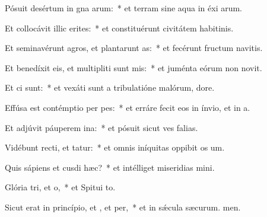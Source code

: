 \item Pósuit desértum in gna arum:~* et terram sine aqua in éxi arum.
\item Et collocávit illic erites:~* et constituérunt civitátem habitinis.
\item Et seminavérunt agros, et plantarunt as:~* et fecérunt fructum navitis.
\item Et benedíxit eis, et multipliti sunt mis:~* et juménta eórum non novit.
\item Et ci  sunt:~* et vexáti sunt a tribulatióne malórum,  dore.
\item Effúsa est contémptio per pes:~* et erráre fecit eos in ínvio, et  in a.
\item Et adjúvit páuperem  ina:~* et pósuit sicut ves falias.
\item Vidébunt recti, et tatur:~* et omnis iníquitas oppibit os um.
\item Quis sápiens et cusdi hæc?~* et intélliget miseridias mini.
\item Glória tri, et o,~* et Spitui to.
\item Sicut erat in princípio, et , et per,~* et in sǽcula sæcurum. men.
